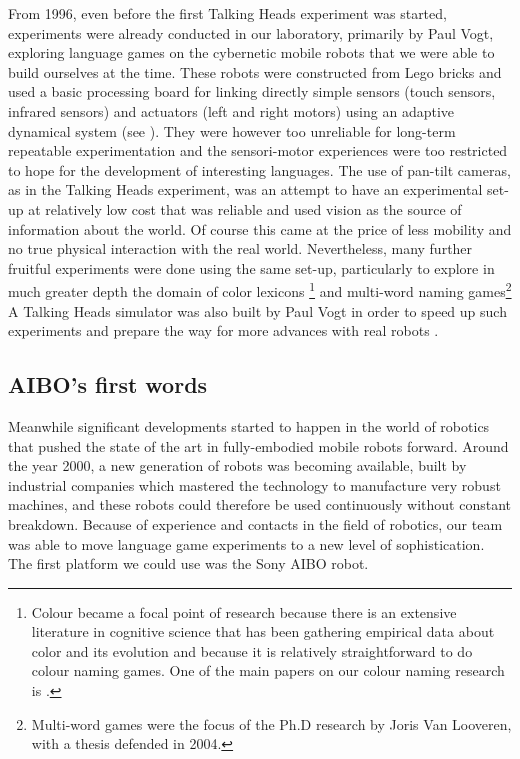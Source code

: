 From 1996, even before the first Talking Heads experiment was started, experiments were already conducted in our 
laboratory, primarily by Paul Vogt, exploring language games on the cybernetic mobile robots that we were able to build ourselves
at the time. These robots were constructed from Lego bricks and 
used a basic processing board for linking directly simple sensors (touch sensors, infrared sensors) and actuators (left and right motors)
using an adaptive dynamical system (see ). They were however too unreliable for long-term repeatable 
experimentation and the sensori-motor experiences were too restricted to hope for the development of interesting languages. The use 
of pan-tilt cameras, as in the Talking Heads experiment, was an attempt to 
have an experimental set-up at relatively low cost that was reliable and
used vision as the source of information about the world. Of course this came
at the price of less mobility and no true physical interaction with the real world. Nevertheless, many further fruitful experiments were 
done using the same set-up, particularly to explore in much greater depth the domain of color lexicons
\footnote{Colour became a focal point of research because there is an extensive literature in cognitive science that has 
been gathering empirical data about color and its evolution and because it is relatively straightforward to do 
colour naming games. One of the main papers on our colour naming research is 
\cite{Steels:2005}.} and multi-word naming games\footnote{Multi-word games were the focus of the Ph.D research by 
Joris Van Looveren, with a thesis defended in 2004.}
A Talking Heads simulator was also built by Paul Vogt in 
order to speed up such experiments and prepare the way for more advances with real robots \citep{Vogt:2003}.

\subsection{AIBO's first words}

Meanwhile significant developments started to happen in the world of robotics that pushed the state of 
the art in fully-embodied mobile robots forward.  
Around the year 2000, a new generation of robots was becoming available, built 
by industrial companies which mastered the technology to manufacture very robust machines, and these robots could therefore
be used continuously without constant breakdown. Because of experience and contacts in the field of
robotics, our team was able to move language game experiments to a new level of sophistication. The first 
platform we could use was the Sony AIBO robot. 

